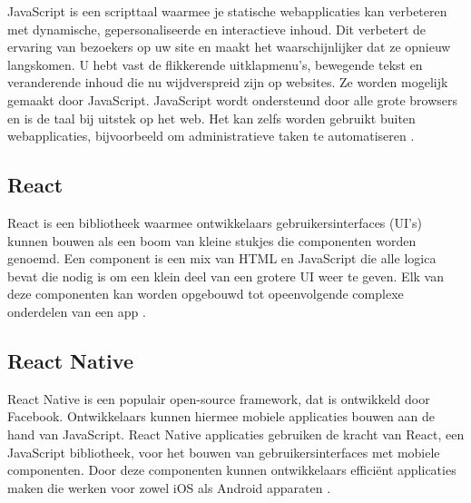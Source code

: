 
JavaScript is een scripttaal waarmee je statische webapplicaties kan verbeteren met dynamische, gepersonaliseerde en interactieve inhoud. Dit verbetert de ervaring van bezoekers op uw site en maakt het waarschijnlijker dat ze opnieuw langskomen. U hebt vast de flikkerende uitklapmenu's, bewegende tekst en veranderende inhoud die nu wijdverspreid zijn op websites. Ze worden mogelijk gemaakt door JavaScript. JavaScript wordt ondersteund door alle grote browsers en is de taal bij uitstek op het web. Het kan zelfs worden gebruikt buiten webapplicaties, bijvoorbeeld om administratieve taken te automatiseren \autocite{Wilton2004}.

\subsection{React}
\label{sec:react}


React is een bibliotheek waarmee ontwikkelaars gebruikersinterfaces (UI's) kunnen bouwen als een boom van kleine stukjes die componenten worden genoemd. Een component is een mix van HTML en JavaScript die alle logica bevat die nodig is om een klein deel van een grotere UI weer te geven. Elk van deze componenten kan worden opgebouwd tot opeenvolgende complexe onderdelen van een app \autocite{Baer2018}.

\subsection{React Native}
\label{sec:react native}

React Native is een populair open-source framework, dat is ontwikkeld door Facebook. Ontwikkelaars kunnen hiermee mobiele applicaties bouwen aan de hand van JavaScript. React Native applicaties gebruiken de kracht van React, een JavaScript bibliotheek, voor het bouwen van gebruikersinterfaces met mobiele componenten. Door deze componenten kunnen ontwikkelaars efficiënt applicaties maken die werken voor zowel iOS als Android apparaten \autocite{Vinnik2021}.



